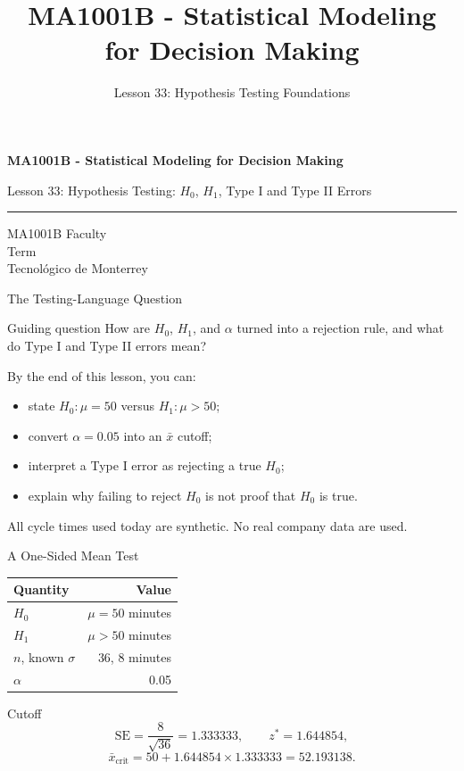 \documentclass[aspectratio=169,10pt,english]{beamer}
\title{MA1001B - Statistical Modeling for Decision Making}
\subtitle{Lesson 33: Hypothesis Testing Foundations}
\author{}
\institute{Tecnol\'ogico de Monterrey}
\date{}
\begin{document}
\begin{frame}[plain]
  \vspace{1.2cm}
  {\Large\bfseries MA1001B - Statistical Modeling for Decision Making\par}
  \vspace{0.7cm}
  {\large Lesson 33: Hypothesis Testing: $H_{0}$, $H_{1}$, Type I and Type II Errors\par}
  \vspace{0.7cm}
  {\color{TecRojo}\rule{\textwidth}{1.2pt}}
  \vspace{0.8cm}

  MA1001B Faculty\\[0.3cm]
  Term\\[0.3cm]
  Tecnol\'ogico de Monterrey
\end{frame}

\begin{frame}{The Testing-Language Question}
  \begin{alertblock}{Guiding question}
    How are $H_{0}$, $H_{1}$, and $\alpha$ turned into a rejection rule, and
    what do Type I and Type II errors mean?
  \end{alertblock}

  \vspace{0.6em}
  By the end of this lesson, you can:
  \begin{itemize}
    \item state $H_{0}:\mu=50$ versus $H_{1}:\mu>50$;
    \item convert $\alpha=0.05$ into an $\bar{x}$ cutoff;
    \item interpret a Type I error as rejecting a true $H_{0}$;
    \item explain why failing to reject $H_{0}$ is not proof that $H_{0}$ is true.
  \end{itemize}

  \vfill
  \scriptsize All cycle times used today are synthetic. No real company data are used.
\end{frame}

\begin{frame}{A One-Sided Mean Test}
  \small
  \begin{center}
    \begin{tabular}{lr}
      \toprule
      \textbf{Quantity} & \textbf{Value} \\
      \midrule
      $H_{0}$ & $\mu=50$ minutes \\
      $H_{1}$ & $\mu>50$ minutes \\
      $n$, known $\sigma$ & 36, 8 minutes \\
      $\alpha$ & 0.05 \\
      \bottomrule
    \end{tabular}
  \end{center}

  \vspace{0.5em}
  \begin{exampleblock}{Cutoff}
    \[
      \mathrm{SE}=\frac{8}{\sqrt{36}}=1.333333,\qquad
      z^{*}=1.644854,
    \]
    \[
      \bar{x}_{\text{crit}}=50+1.644854\times 1.333333=52.193138.
    \]
  \end{exampleblock}
\end{frame}
\end{document}
